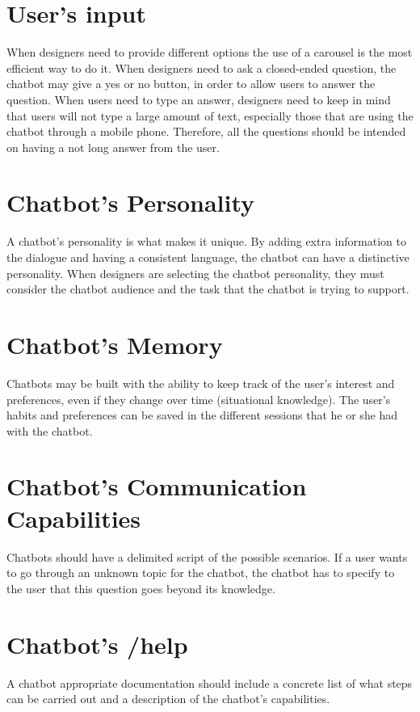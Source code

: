 \documentclass[a4paper,10pt]{article}
\begin{document}
\section{User's input}

When designers need to provide different options the use of a carousel is the most efficient way to do it. When designers need to ask a closed-ended question, the chatbot may give a yes or no button, in order to allow users to answer the question. When users need to type an answer, designers need to keep in mind that users will not type a large amount of text, especially those that are using the chatbot through a mobile phone. Therefore, all the questions should be intended on having a not long answer from the user. 

\section{Chatbot's Personality}

A chatbot’s personality is what makes it unique. By adding extra information to the dialogue and having a consistent language, the chatbot can have a distinctive personality. When designers are selecting the chatbot personality, they must consider the chatbot audience and the task that the chatbot is trying to support.

\section{Chatbot's Memory}

Chatbots may be built with the ability to keep track of the user’s interest and preferences, even if they change over time (situational knowledge).  The user’s habits and preferences can be saved in the different sessions that he or she had with the chatbot.

\section{Chatbot's Communication Capabilities}

Chatbots should have a delimited script of the possible scenarios. If a user wants to go through an unknown topic for the chatbot, the chatbot has to specify to the user that this question goes beyond its knowledge.

\section{Chatbot's /help}

A chatbot appropriate documentation should include a concrete list of what steps can be carried out and a description of the chatbot’s capabilities.

\medskip


\end{document}

